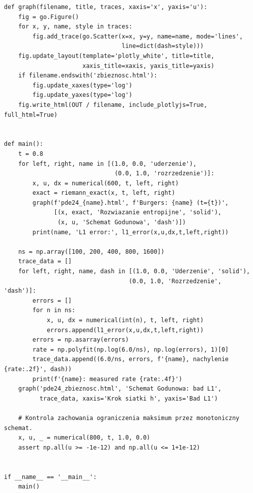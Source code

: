 \begin{lstlisting}[style=pythonpde,caption={Fala uderzeniowa, fala rozrzedzenia i metoda Godunowa — Plotly},label={code:pde24-plotly}]
def graph(filename, title, traces, xaxis='x', yaxis='u'):
    fig = go.Figure()
    for x, y, name, style in traces:
        fig.add_trace(go.Scatter(x=x, y=y, name=name, mode='lines',
                                 line=dict(dash=style)))
    fig.update_layout(template='plotly_white', title=title,
                      xaxis_title=xaxis, yaxis_title=yaxis)
    if filename.endswith('zbieznosc.html'):
        fig.update_xaxes(type='log')
        fig.update_yaxes(type='log')
    fig.write_html(OUT / filename, include_plotlyjs=True, full_html=True)


def main():
    t = 0.8
    for left, right, name in [(1.0, 0.0, 'uderzenie'),
                               (0.0, 1.0, 'rozrzedzenie')]:
        x, u, dx = numerical(600, t, left, right)
        exact = riemann_exact(x, t, left, right)
        graph(f'pde24_{name}.html', f'Burgers: {name} (t={t})',
              [(x, exact, 'Rozwiazanie entropijne', 'solid'),
               (x, u, 'Schemat Godunowa', 'dash')])
        print(name, 'L1 error:', l1_error(x,u,dx,t,left,right))

    ns = np.array([100, 200, 400, 800, 1600])
    trace_data = []
    for left, right, name, dash in [(1.0, 0.0, 'Uderzenie', 'solid'),
                                   (0.0, 1.0, 'Rozrzedzenie', 'dash')]:
        errors = []
        for n in ns:
            x, u, dx = numerical(int(n), t, left, right)
            errors.append(l1_error(x,u,dx,t,left,right))
        errors = np.asarray(errors)
        rate = np.polyfit(np.log(6.0/ns), np.log(errors), 1)[0]
        trace_data.append((6.0/ns, errors, f'{name}, nachylenie {rate:.2f}', dash))
        print(f'{name}: measured rate {rate:.4f}')
    graph('pde24_zbieznosc.html', 'Schemat Godunowa: bad L1',
          trace_data, xaxis='Krok siatki h', yaxis='Bad L1')

    # Kontrola zachowania ograniczenia maksimum przez monotoniczny schemat.
    x, u, _ = numerical(800, t, 1.0, 0.0)
    assert np.all(u >= -1e-12) and np.all(u <= 1+1e-12)


if __name__ == '__main__':
    main()
\end{lstlisting}


